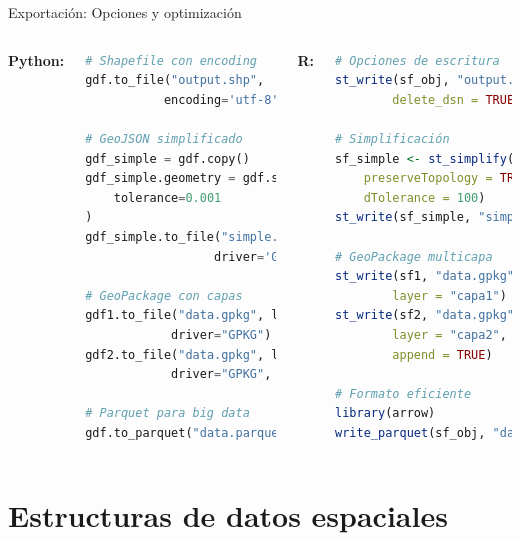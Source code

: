 \documentclass[10pt,aspectratio=169]{beamer}
\begin{document}
\begin{frame}[fragile]{Exportación: Opciones y optimización}
    \begin{columns}[T]
        \textbf{Python:}
        \begin{lstlisting}[language=Python]
# Shapefile con encoding
gdf.to_file("output.shp", 
           encoding='utf-8')

# GeoJSON simplificado
gdf_simple = gdf.copy()
gdf_simple.geometry = gdf.simplify(
    tolerance=0.001
)
gdf_simple.to_file("simple.geojson",
                  driver='GeoJSON')

# GeoPackage con capas
gdf1.to_file("data.gpkg", layer='capa1',
            driver="GPKG")
gdf2.to_file("data.gpkg", layer='capa2',
            driver="GPKG", mode='a')

# Parquet para big data
gdf.to_parquet("data.parquet")
        \end{lstlisting}
        
        \textbf{R:}
        \begin{lstlisting}[language=R]
# Opciones de escritura
st_write(sf_obj, "output.shp",
        delete_dsn = TRUE)

# Simplificación
sf_simple <- st_simplify(sf_obj,
    preserveTopology = TRUE,
    dTolerance = 100)
st_write(sf_simple, "simple.json")

# GeoPackage multicapa
st_write(sf1, "data.gpkg",
        layer = "capa1")
st_write(sf2, "data.gpkg",
        layer = "capa2",
        append = TRUE)

# Formato eficiente
library(arrow)
write_parquet(sf_obj, "data.parquet")
        \end{lstlisting}
    \end{columns}
\end{frame}

\section{Estructuras de datos espaciales}
\end{document}
